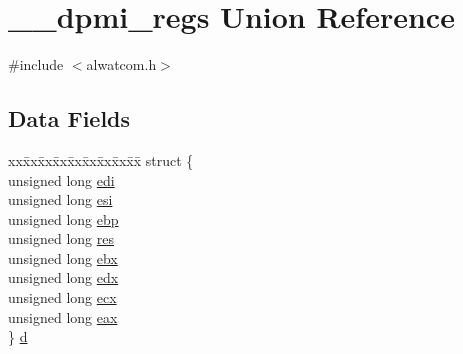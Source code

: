 \hypertarget{union____dpmi__regs}{}\section{\+\_\+\+\_\+dpmi\+\_\+regs Union Reference}
\label{union____dpmi__regs}


{\ttfamily \#include $<$alwatcom.\+h$>$}

\subsection*{Data Fields}
\begin{DoxyCompactItemize}
\item 
\begin{tabbing}
xx\=xx\=xx\=xx\=xx\=xx\=xx\=xx\=xx\=\kill
struct \{\\
\>unsigned long \hyperlink{union____dpmi__regs_a9f8882ef5845b112f72327f3d5f6be0f}{edi}\\
\>unsigned long \hyperlink{union____dpmi__regs_a5d244ff76ff7691f874214361988e4c5}{esi}\\
\>unsigned long \hyperlink{union____dpmi__regs_ae6cd3c4b006d36581680f3cc72cab1f2}{ebp}\\
\>unsigned long \hyperlink{union____dpmi__regs_afd105cdae9d9f757bf8961cc05feeb94}{res}\\
\>unsigned long \hyperlink{union____dpmi__regs_a942848979331dbd18dcf0f10c48d0257}{ebx}\\
\>unsigned long \hyperlink{union____dpmi__regs_a59b225f98a4bd09b8f7e0f5549420fa7}{edx}\\
\>unsigned long \hyperlink{union____dpmi__regs_ae119558ae6af03a1738833545fa55fb6}{ecx}\\
\>unsigned long \hyperlink{union____dpmi__regs_acb89033c4d0c8d318251f245f27cbc7e}{eax}\\
\} \hyperlink{union____dpmi__regs_a9fa9ab31aa42d6f801bc7918f36e3ede}{d}\\


\end{tabbing}
\end{DoxyCompactItemize}
